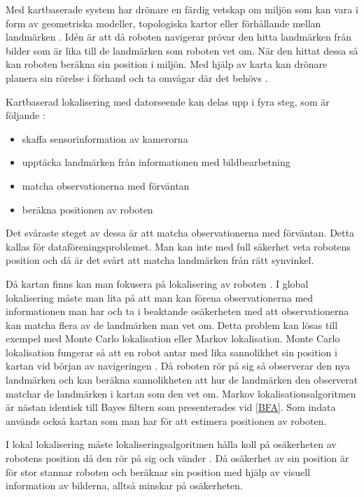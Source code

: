 Med kartbaserade system har drönare en färdig vetskap om miljön som kan vara i form av geometriska modeller, topologiska kartor eller förhållande mellan landmärken \citep{982903}. Idén är att då roboten navigerar prövar den hitta landmärken från bilder som är lika till de landmärken som roboten vet om. När den hittat dessa så kan roboten beräkna sin position i miljön. Med hjälp av karta kan drönare planera sin rörelse i förhand och ta omvägar där det behövs \citep{geospatial}. 

Kartbaserad lokalisering med datorseende kan delas upp i fyra steg, som är följande \citep{982903}:

\begin{itemize}
    \item skaffa sensorinformation av kamerorna
    \item upptäcka landmärken från informationen med bildbearbetning
    \item matcha observationerna med förväntan
    \item beräkna positionen av roboten
\end{itemize}

Det svåraste steget av dessa är att matcha observationerna med förväntan. Detta kallas för dataföreningsproblemet. Man kan inte med full säkerhet veta robotens position och då är det svårt att matcha landmärken från rätt synvinkel.

Då kartan finns kan man fokusera på lokalisering av roboten \citep{982903}. I global lokalisering måste man lita på att man kan förena observationerna med informationen man har och ta i beaktande osäkerheten med att observationerna kan matcha flera av de landmärken man vet om. Detta problem kan lösas till exempel med Monte Carlo lokalisation eller Markov lokalisation. Monte Carlo lokalisation fungerar så att en robot antar med lika sannolikhet sin position i kartan vid början av navigeringen \citep{montecarlo}. Då roboten rör på sig så observerar den nya landmärken och kan beräkna sannolikheten att hur de landmärken den observerat matchar de landmärken i kartan som den vet om. Markov lokalisationsalgoritmen är nästan identisk till Bayes filtern som presenterades vid \ref{BFA}. Som indata används också kartan som man har för att estimera positionen av roboten.

I lokal lokalisering måste lokaliseringsalgoritmen hålla koll på osäkerheten av robotens position då den rör på sig och vänder \citep{montecarlo}. Då osäkerhet av sin position är för stor stannar roboten och beräknar sin position med hjälp av visuell information av bilderna, alltså minskar på osäkerheten.


